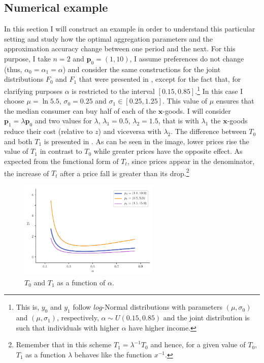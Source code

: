 \documentclass[english, a4paper,12pt]{article}
\begin{document}
\subsection{Numerical example} \label{ssec:Category-Example}
In this section I will construct an example in order to understand this particular setting and study how the optimal aggregation parameters and the approximation accuracy change between one period and the next. For this purpose, I take $n = 2$ and $\mathbf{p}_{0} = (1,10)$, I assume preferences do not change (thus, $\alpha_{0} = \alpha_{1} = \alpha$) and consider the same constructions for the joint distributions $F_{0}$ and $F_{1}$ that were presented in , except for the fact that, for clarifying purposes $\alpha$ is restricted to the interval $[0.15, 0.85]$.\footnote{This is, $y_{0}$ and $y_{1}$ follow $log$-Normal distributions with parameters $(\mu, \sigma_{0})$ and $(\mu, \sigma_{1})$, respectively, $\alpha \sim U(0.15, 0.85)$ and the joint distribution is such that individuals with higher $\alpha$ have higher income.} In this case I choose $\mu = \ln 5.5$, $\sigma_{0} = 0.25$ and $\sigma_{1} \in [0.25, 1.25]$. This value of $\mu$ ensures that the median consumer can buy half of each of the $\mathbf{x}$-goods.  I will consider $\mathbf{p}_{1} = \lambda\mathbf{p}_{0}$ and two values for $\lambda$, $\lambda_{1} = 0.5$, $\lambda_{2} = 1.5$, that is with $\lambda_{1}$ the $\mathbf{x}$-goods reduce their cost (relative to $z$) and viceversa with $\lambda_{2}$. The difference between $T_{0}$ and both $T_{1}$ is presented in . As can be seen in the image, lower prices rise the value of $T_{1}$ in contrast to $T_{0}$ while greater prices have the opposite effect. As expected from the functional form of $T_{t}$, since prices appear in the denominator, the increase of $T_{t}$ after a price fall is greater than its drop.\footnote{Remember that in this scheme $T_{1} = \lambda^{-1}T_{0}$ and hence, for a given value of $T_{0}$, $T_{1}$ as a function $\lambda$ behaves like the function $x^{-1}$.}
	\begin{figure}[H]
		\caption{$T_{0}$ and $T_{1}$ as a function of $\alpha$.}
		\label{fig:DiffTtLambda}
		\includegraphics[width = 0.6\textwidth]{TtLambdas}
	\end{figure}
\end{document}
